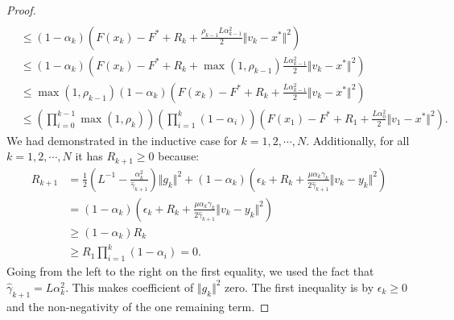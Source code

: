 \documentclass[12pt]{article}
\begin{document}
\begin{proof}
{\begin{align*}
            \\
            &\le 
            (1 - \alpha_k)
            \left(
                F(x_k) - F^* + R_k + \frac{\rho_{k - 1}L \alpha_{k - 1}^2}{2}\Vert v_k - x^*\Vert^2
            \right)
            \\
            &\le 
            (1 - \alpha_k)
            \left(
                F(x_k) - F^* + R_k + \max(1, \rho_{k - 1})\frac{L \alpha_{k - 1}^2}{2}\Vert v_k - x^*\Vert^2
            \right)
            \\
            &\le 
            \max(1, \rho_{k - 1})(1 - \alpha_k)
            \left(
                F(x_k) - F^* + R_k + \frac{L \alpha_{k - 1}^2}{2}\Vert v_k - x^*\Vert^2
            \right)
            \\
            &\le 
            \left(
                \prod_{i = 0}^{k - 1} \max(1, \rho_{k})
            \right)
            \left(
                \prod_{i = 1}^{k} \left(1  - \alpha_i\right)
            \right)
            \left(
                F(x_1) - F^* + R_1 + \frac{L\alpha_0^2}{2}\Vert v_1 - x^*\Vert^2
            \right). 
        \end{align*}
        }
        We had demonstrated in the inductive case for $k=1, 2, \cdots, N$. 
        Additionally, for all $k = 1, 2, \cdots, N$ it has $R_{k + 1} \ge 0$ because: 
        \begin{align*}
            R_{k + 1}
            &= 
            \frac{1}{2}\left(
                L^{-1} - \frac{\alpha_k^2}{\hat \gamma_{k + 1}}
            \right)\Vert g_k\Vert^2
            + 
            (1 - \alpha_k)
            \left(
                \epsilon_k + R_k + 
                \frac{\mu\alpha_k\gamma_k}{2\hat \gamma_{k + 1}}
                \Vert v_k - y_k\Vert^2
            \right)
            \\
            &= (1 - \alpha_k)
            \left(
                \epsilon_k + R_k 
                + \frac{\mu\alpha_k\gamma_k}{2\hat \gamma_{k + 1}}
                \Vert v_k - y_k\Vert^2
            \right)
            \\
            &\ge 
            (1 - \alpha_k) R_k
            \\
            &\ge R_1 \prod_{i = 1}^{k} \left(1 - \alpha_i\right) = 0. 
        \end{align*}
        Going from the left to the right on the first equality, we used the fact that $\hat \gamma_{k + 1} = L \alpha_{k}^2$.
        This makes coefficient of $\Vert g_k\Vert^2$ zero. 
        The first inequality is by $\epsilon_k \ge 0$ and the non-negativity of the one remaining term. 

\end{proof}
\end{document}
